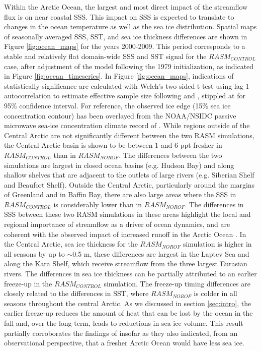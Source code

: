 \documentclass[jgrga, draft]{agutex}
\begin{document}
\begin{article}
Within the Arctic Ocean, the largest and most direct impact of the streamflow flux is on near coastal SSS.
This impact on SSS is expected to translate to changes in the ocean temperature as well as the sea ice distribution.
Spatial maps of seasonally averaged SSS, SST, and sea ice thickness differences are shown in Figure \ref{fig:ocean_maps} for the years 2000-2009. This period corresponds to a stable and relatively flat domain-wide SSS and SST signal for the $RASM_{CONTROL}$ case, after adjustment of the model following the 1979 initialization, as indicated in Figure \ref{fig:ocean_timeseries}.
In Figure \ref{fig:ocean_maps}, indications of statistically significance are calculated with Welch’s two-sided t-test using lag-1 autocorrelation to estimate effective sample size following \citet{VonStorch1999} and \citet{Wilks2006}, stippled at for 95\% confidence interval.  For reference, the observed ice edge (15\% sea ice concentration contour) has been overlayed from the NOAA/NSIDC passive microwave sea-ice concentration climate record of \citep{Meier2013}.
While regions outside of the Central Arctic are not significantly different between the two RASM simulations, the Central Arctic basin is shown to be between 1 and 6 ppt fresher in $RASM_{CONTROL}$ than in $RASM_{NOROF}$.
The differences between the two simulations are largest in closed ocean basins (e.g. Hudson Bay) and along shallow shelves that are adjacent to the outlets of large rivers (e.g. Siberian Shelf and Beaufort Shelf).
Outside the Central Arctic, particularly around the margins of Greenland and in Baffin Bay, there are also large areas where the SSS in $RASM_{CONTROL}$ is considerably lower than in $RASM_{NOROF}$.
The differences in SSS between these two RASM simulations in these areas highlight the local and regional importance of streamflow as a driver of ocean dynamics, and are coherent with the observed impact of increased runoff in the Arctic Ocean \citep [e.g.][]{Morison_2012}.
In the Central Arctic, sea ice thickness for the $RASM_{NOROF}$ simulation is higher in all seasons by up to $\sim$0.5 m, these differences are largest in the Laptev Sea and along the Kara Shelf, which receive streamflow from the three largest Eurasian rivers.
The differences in sea ice thickness can be partially attributed to an earlier freeze-up in the $RASM_{CONTROL}$ simulation.
The freeze-up timing differences are closely related to the differences in SST, where $RASM_{NOROF}$ is colder in all seasons throughout the central Arctic.
As we discussed in section \ref{sec:intro}, the earlier freeze-up reduces the amount of heat that can be lost by the ocean in the fall and, over the long-term, leads to reductions in sea ice volume.
This result partially corroborates the findings of \citep{Morison_2012} insofar as they also indicated, from an observational perspective, that a fresher Arctic Ocean would have less sea ice.


\end{article}
\end{document}
